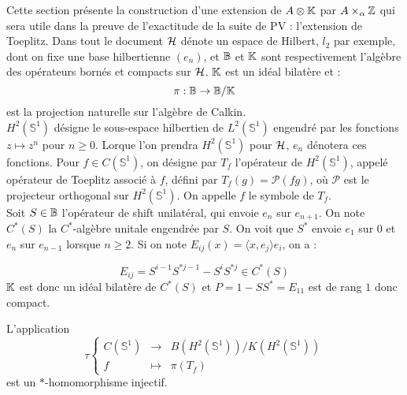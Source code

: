 Cette section présente la construction d'une extension de $A\otimes \mathbb K$ par $A\times_\alpha \mathbb Z$ qui sera utile dans la preuve de l'exactitude de la suite de PV : l'extension de Toeplitz. Dans tout le document $\mathcal H$ dénote un espace de Hilbert, $l_2$ par exemple, dont on fixe une base hilbertienne $(e_n)$, et $\mathbb B$ et $\mathbb K$ sont respectivement l'algèbre des opérateurs bornés et compacts sur $\mathcal H$. $\mathbb K$ est un idéal bilatère et :
\[\pi : \mathbb B \rightarrow \mathbb B / \mathbb K\]
est la projection naturelle sur l'algèbre de Calkin. \\
$H^2(\mathbb S^1)$ désigne le sous-espace hilbertien de $L^2(\mathbb S ^1)$ engendré par les fonctions $z \mapsto z^n$ pour $n\geq 0$. Lorque l'on prendra $H^2(\mathbb S^1)$ pour $\mathcal H$, $e_n$ dénotera ces fonctions. Pour $f\in C(\mathbb S^1)$, on désigne par $T_f$ l'opérateur de $H^2(\mathbb S^1)$, appelé opérateur de Toeplitz associé à $f$, défini par $T_f(g)=\mathcal P(fg)$, où $\mathcal P$ est le projecteur orthogonal sur $H^2(\mathbb S^1)$. On appelle $f$ le symbole de $T_f$.\\

Soit $S\in \mathbb B$ l'opérateur de shift unilatéral, qui envoie $e_n$ sur $e_{n+1}$. On note $C^*(S)$ la $C^*$-algèbre unitale engendrée par $S$. On voit que $S^*$ envoie $e_1$ sur $0$ et $e_n$ sur $e_{n-1}$ lorsque $n\geq 2$. Si on note $E_{ij}(x)=\langle x,e_j\rangle e_i$, on a :

\[E_{ij} = S^{i-1}S^{*j-1}-S^{i}S^{*j}\in C^*(S)\]
$\mathbb K $ est donc un idéal bilatère de $C^*(S)$ et $P=1-SS^* = E_{11}$ est de rang $1$ donc compact.\\

\begin{lem}
L'application 
\[\tau \left\{\begin{array}{rcl} C(\mathbb S^1)  & \rightarrow & B(H^2(\mathbb S^1))/K(H^2(\mathbb S^1)) \\ 
f & \mapsto & \pi(T_f)\end{array}\right.\]
est un $*$-homomorphisme injectif.
\end{lem}

